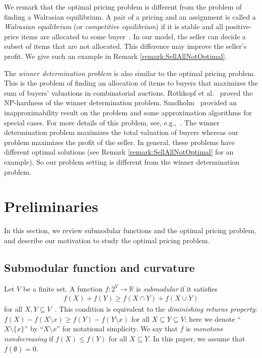 \documentclass[letterpaper]{article}
\theoremstyle{definition}
\begin{document}
We remark that the optimal pricing problem is different from the problem of finding a Walrasian equilibrium.
A pair of a pricing and an assignment is called a \emph{Walrasian equilibrium} (or \emph{competitive equilibrium}) if it is stable and all positive-price items are allocated to some buyer~\cite{nisan2007algorithmic11}.
In our model, the seller can decide a subset of items that are not allocated.
This difference may improve the seller's profit.
We give such an example in Remark \ref{remark:SellAllNotOptimal}.

The \emph{winner determination problem} is also similar to the optimal pricing problem.
This is the problem of finding an allocation of items to buyers that maximizes the sum of buyers' valuations in combinatorial auctions.
Rothkopf et al.~ proved the NP-hardness of the winner determination problem. %
Sandholm~ provided an inapproximability result on the problem and some approximation algorithms for special cases.
For more details of this problem, see, e.g.,~\cite{nisan2007algorithmic11,cramton2006combinatorial}.
The winner determination problem maximizes the total valuation of buyers whereas our problem maximizes the profit of the seller.
In general, these problems have different optimal solutions (see Remark \ref{remark:SellAllNotOptimal} for an example).
So our problem setting is different from the winner determination problem.



\section{Preliminaries}
\label{sec:preliminaries}

In this section, we review submodular functions and the optimal pricing problem, and describe our motivation to study the optimal pricing problem.



\subsection{Submodular function and curvature}

Let $V$ be a finite set.
A function $f: 2^V \to \mathbb{R}$ is \emph{submodular} if it satisfies
\begin{align}
  \label{eq:submodular}
  f(X) + f(Y) \ge f(X \cap Y) + f(X \cup Y)
\end{align}
for all $X, Y \subseteq V$~\cite{fujishige2005submodular}.
This condition is equivalent to the \emph{diminishing returns property}:
$f(X) - f(X \setminus x) \ge f(Y) - f(Y \setminus x)$
for all $X \subseteq Y \subseteq V$;
here we denote ``$X \setminus \{x\}$'' by ``$X \setminus x$'' for notational simplicity.
We say that $f$ is \emph{monotone nondecreasing} if $f(X) \le f(Y)$ for all $X \subseteq Y$.
In this paper, we assume that $f(\emptyset) = 0$.
\end{document}
